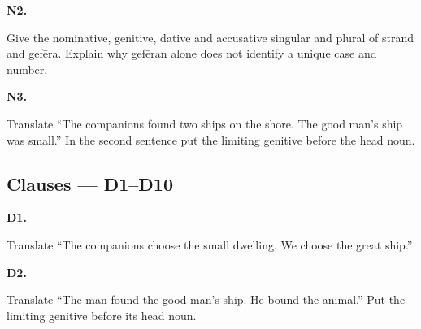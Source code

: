\par\begin{minipage}{\linewidth}\raggedright
\textbf{N2.}

Give the nominative, genitive, dative and accusative singular and plural of strand and gefēra. Explain why gefēran alone does not identify a unique case and number.

\end{minipage}\par\addvspace{4pt}

\par\begin{minipage}{\linewidth}\raggedright
\textbf{N3.}

Translate “The companions found two ships on the shore. The good man’s ship was small.” In the second sentence put the limiting genitive before the head noun.

\end{minipage}\par\addvspace{4pt}

\subsection*{Clauses — D1–D10}

\par\begin{minipage}{\linewidth}\raggedright
\textbf{D1.}

Translate “The companions choose the small dwelling. We choose the great ship.”

\end{minipage}\par\addvspace{4pt}

\par\begin{minipage}{\linewidth}\raggedright
\textbf{D2.}

Translate “The man found the good man’s ship. He bound the animal.” Put the limiting genitive before its head noun.

\end{minipage}\par\addvspace{4pt}

